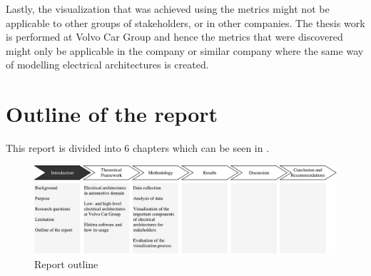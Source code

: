 Lastly, the visualization that was achieved using the metrics might not be applicable to other groups of stakeholders, or in other companies. The thesis work is performed at Volvo Car Group and hence the metrics that were discovered might only be applicable in the company or similar company where the same way of modelling electrical architectures is created.


\section{Outline of the report} \label{Outline_ref}
This report is divided into 6 chapters which can be seen in . 
\begin{figure}[H]
\centering
\captionsetup{justification=centering}
\vspace{0cm}%
\includegraphics[width=1\linewidth]{figure/report_outline.pdf}
\caption{Report outline}
\end{figure}